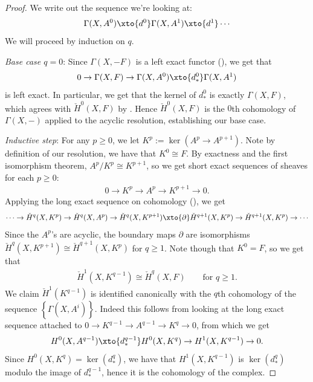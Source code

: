 \documentclass[11pt]{amsart}
\begin{document}
\begin{proof} We write out the sequence we're looking at:
\begin{align*}
    \Gamma(X,A^0) \xto{d^0} \Gamma(X,A^1) \xto{d^1} \cdots
\end{align*}
We will proceed by induction on $q$. 

\emph{Base case $q=0$}: Since $\Gamma(X,-F)$ is a left exact functor (), we get that
\begin{align*}
    0 \to \Gamma(X,F) \to \Gamma(X,A^0) \xto{d^0_\ast} \Gamma(X,A^1)
\end{align*}
is left exact. In particular, we get that the kernel of $d^0_\ast$ is exactly $\Gamma(X,F)$, which agrees with $\check{H}^0(X,F)$ by . Hence $\check{H}^0(X,F)$ is the $0$th cohomology of $\Gamma(X,-)$ applied to the acyclic resolution, establishing our base case.

\emph{Inductive step}: For any $p\ge0$, we let $K^p := \ker(A^p \to A^{p+1})$. Note by definition of our resolution, we have that $K^0\cong F$. By exactness and the first isomorphism theorem, $A^p/K^p \cong K^{p+1}$, so we get short exact sequences of sheaves for each $p\ge 0$:
\begin{align*}
    0 \to K^p \to A^p \to K^{p+1}\to 0.
\end{align*}
Applying the long exact sequence on cohomology (), we get
\begin{align*}
    \cdots \to \check{H}^q(X,K^p) \to \check{H}^q(X,A^p) \to \check{H}^q(X,K^{p+1})\xto{\partial} \check{H}^{q+1}(X,K^p) \to \check{H}^{q+1}(X,K^p) \to \cdots
\end{align*}
Since the $A^p$'s are acyclic, the boundary maps $\partial$ are isomorphisms $\check{H}^q(X,K^{p+1})\cong \check{H}^{q+1}(X,K^p)$ for $q\ge 1$. Note though that $K^0 = F$, so we get that
\begin{align*}
    \check{H}^1(X,K^{q-1}) \cong \check{H}^q(X,F) \quad\quad \text{for }q\ge1.
\end{align*}
We claim $\check{H}^1(K^{q-1})$ is identified canonically with the $q$th cohomology of the sequence $\left\{ \Gamma(X,A^i) \right\}$. Indeed this follows from looking at the long exact sequence attached to $0 \to K^{q-1} \to A^{q-1}\to K^q \to 0$, from which we get
\begin{align*}
    H^0(X,A^{q-1}) \xto{d^{q-1}_\ast} H^0(X,K^q) \to H^1(X,K^{q-1}) \to 0.
\end{align*}
Since $H^0(X,K^q) = \ker(d^q_\ast)$, we have that $H^1(X,K^{q-1})$ is $\ker(d^q_\ast)$ modulo the image of $d^{q-1}_\ast$, hence it is the cohomology of the complex.
\end{proof}
\end{document}
